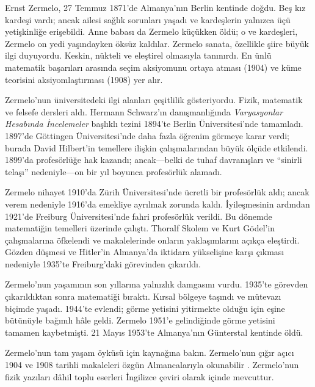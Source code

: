 \documentclass[../../../include/open-logic-section]{subfiles}
\begin{document}



Ernst Zermelo, 27 Temmuz 1871'de Almanya'nın Berlin kentinde doğdu. Beş kız
kardeşi vardı; ancak ailesi sağlık sorunları yaşadı ve kardeşlerin yalnızca
üçü yetişkinliğe erişebildi. Anne babası da Zermelo küçükken öldü; o ve
kardeşleri, Zermelo on yedi yaşındayken öksüz kaldılar. Zermelo sanata,
özellikle şiire büyük ilgi duyuyordu. Keskin, nükteli ve eleştirel olmasıyla
tanınırdı. En ünlü matematik başarıları arasında seçim aksiyomunu ortaya
atması (1904) ve küme teorisini aksiyomlaştırması (1908) yer alır.

Zermelo'nun üniversitedeki ilgi alanları çeşitlilik gösteriyordu. Fizik,
matematik ve felsefe dersleri aldı. Hermann Schwarz'ın danışmanlığında
\emph{Varyasyonlar Hesabında İncelemeler} başlıklı tezini 1894'te Berlin
Üniversitesi'nde tamamladı. 1897'de G\"{o}ttingen Üniversitesi'nde daha fazla
öğrenim görmeye karar verdi; burada David Hilbert'in temellere ilişkin
çalışmalarından büyük ölçüde etkilendi. 1899'da profesörlüğe hak kazandı;
ancak---belki de tuhaf davranışları ve ``sinirli telaşı'' nedeniyle---on bir
yıl boyunca profesörlük alamadı.

Zermelo nihayet 1910'da Zürih Üniversitesi'nde ücretli bir profesörlük aldı;
ancak verem nedeniyle 1916'da emekliye ayrılmak zorunda kaldı. İyileşmesinin
ardından 1921'de Freiburg Üniversitesi'nde fahri profesörlük verildi. Bu
dönemde matematiğin temelleri üzerinde çalıştı. Thoralf Skolem ve Kurt
G\"{o}del'in çalışmalarına öfkelendi ve makalelerinde onların yaklaşımlarını
açıkça eleştirdi. Gözden düşmesi ve Hitler'in Almanya'da iktidara yükselişine
karşı çıkması nedeniyle 1935'te Freiburg'daki görevinden çıkarıldı.
 
Zermelo'nun yaşamının son yıllarına yalnızlık damgasını vurdu. 1935'te
görevden çıkarıldıktan sonra matematiği bıraktı. Kırsal bölgeye taşındı ve
mütevazı biçimde yaşadı. 1944'te evlendi; görme yetisini yitirmekte olduğu
için eşine bütünüyle bağımlı hâle geldi. Zermelo 1951'e gelindiğinde görme
yetisini tamamen kaybetmişti. 21 Mayıs 1953'te Almanya'nın G\"{u}nterstal
kentinde öldü.

\begin{reading}
Zermelo'nun tam yaşam öyküsü için \citet{Ebbinghaus2015} kaynağına bakın.
Zermelo'nun çığır açıcı 1904 ve 1908 tarihli makaleleri özgün Almancalarıyla
okunabilir \citep{Zermelo1904,Zermelo1908}. Zermelo'nun fizik yazıları dâhil
toplu eserleri İngilizce çeviri olarak \citep{Ebbinghaus2010,Ebbinghaus2013}
içinde mevcuttur.
\end{reading}
\end{document}

